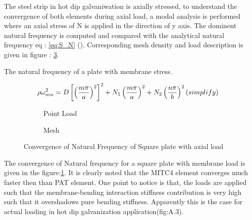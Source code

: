 \documentclass[main.tex]{subfiles}
\begin{document}
The steel strip in hot dip galvaniwation is axially stressed, to understand the convergence of both elements during axial load, a modal analysis is performed where an axial stress of N is applied in the direction of y axis. The dominent natural frequency is computed and compared with the analytical natural frequency eq : \ref{eq:S_N} (\cite{LEISSA_NASA}). Corresponding mesh density and load description is given in figure : \ref{fig:Mesh_Density_S}. 

The natural frequency of a plate with membrane stress.

\begin{equation}{\label{eq:S_N}}
\rho \omega_{mn}^{2} = D \left[ \left( \frac{m\pi}{a}\right)^2 \right]^2 + N_1 \left(\frac{m \pi}{a} \right)^2 + N_2 \left( \frac{n\pi}{b} \right) ^2 (simplify)
\end{equation} 

\begin{figure}[t]
\centering
\begin{subfigure}[t]{0.75\textwidth}
\centering


\caption{Point Load}
\label{fig:S_N}
\end{subfigure} \hfill
\begin{subfigure}[t]{0.24\textwidth}
\centering


\caption{Mesh}
\label{fig:Mesh_Density_S}
\end{subfigure}

\caption{Convergence of Natural Frequency of Square plate with axial load}
\end{figure}

The convergence of Natural frequency for a square plate with membrane load is given in the figure:\ref{fig:S_N}. It is clearly noted that the MITC4 element converges much faster then than PAT element. One point to notice is that, the loads are applied such that the membrane-bending interaction stiffness contribution is very high such that it overshadows pure bending stiffness. Apparently this is the case for actual loading in hot dip galvanization application(fig:A.3). 
\end{document}
